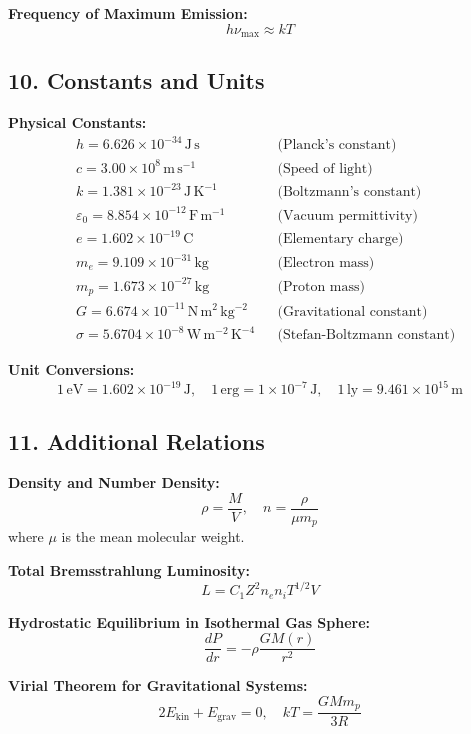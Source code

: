 \documentclass{article}
\begin{document}
\textbf{Frequency of Maximum Emission:}
\[
    h\nu_{\text{max}} \approx k T
\]

\subsection*{10. Constants and Units}

\textbf{Physical Constants:}
\begin{align*}
     & h = 6.626 \times 10^{-34} \, \mathrm{J\,s}                   &  & \text{(Planck's constant)}         \\
     & c = 3.00 \times 10^8 \, \mathrm{m\,s^{-1}}                   &  & \text{(Speed of light)}            \\
     & k = 1.381 \times 10^{-23} \, \mathrm{J\,K^{-1}}              &  & \text{(Boltzmann's constant)}      \\
     & \varepsilon_0 = 8.854 \times 10^{-12} \, \mathrm{F\,m^{-1}}  &  & \text{(Vacuum permittivity)}       \\
     & e = 1.602 \times 10^{-19} \, \mathrm{C}                      &  & \text{(Elementary charge)}         \\
     & m_e = 9.109 \times 10^{-31} \, \mathrm{kg}                   &  & \text{(Electron mass)}             \\
     & m_p = 1.673 \times 10^{-27} \, \mathrm{kg}                   &  & \text{(Proton mass)}               \\
     & G = 6.674 \times 10^{-11} \, \mathrm{N\,m^2\,kg^{-2}}        &  & \text{(Gravitational constant)}    \\
     & \sigma = 5.6704 \times 10^{-8} \, \mathrm{W\,m^{-2}\,K^{-4}} &  & \text{(Stefan-Boltzmann constant)}
\end{align*}

\textbf{Unit Conversions:}
\[
    1 \, \mathrm{eV} = 1.602 \times 10^{-19} \, \mathrm{J}, \quad
    1 \, \mathrm{erg} = 1 \times 10^{-7} \, \mathrm{J}, \quad
    1 \, \mathrm{ly} = 9.461 \times 10^{15} \, \mathrm{m}
\]

\subsection*{11. Additional Relations}

\textbf{Density and Number Density:}
\[
    \rho = \frac{M}{V}, \quad n = \frac{\rho}{\mu m_p}
\]
where \( \mu \) is the mean molecular weight.

\textbf{Total Bremsstrahlung Luminosity:}
\[
    L = C_1 Z^2 n_e n_i T^{1/2} V
\]

\textbf{Hydrostatic Equilibrium in Isothermal Gas Sphere:}
\[
    \frac{dP}{dr} = -\rho \frac{G M(r)}{r^2}
\]

\textbf{Virial Theorem for Gravitational Systems:}
\[
    2 E_{\text{kin}} + E_{\text{grav}} = 0, \quad k T = \frac{G M m_p}{3 R}
\]
\end{document}
